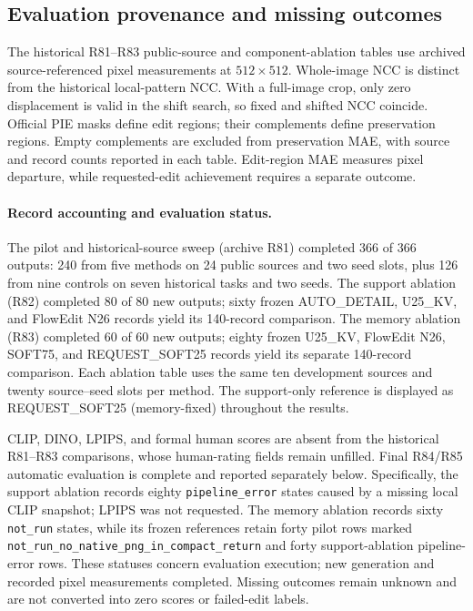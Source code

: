 \subsection{Evaluation provenance and missing outcomes}
\label{app:evaluation-provenance}
The historical R81--R83 public-source and component-ablation tables use archived source-referenced pixel measurements at $512\times512$. Whole-image NCC is distinct from the historical local-pattern NCC. With a full-image crop, only zero displacement is valid in the shift search, so fixed and shifted NCC coincide. Official PIE masks define edit regions; their complements define preservation regions. Empty complements are excluded from preservation MAE, with source and record counts reported in each table. Edit-region MAE measures pixel departure, while requested-edit achievement requires a separate outcome.

\paragraph{Record accounting and evaluation status.}
The pilot and historical-source sweep (archive R81) completed 366 of 366 outputs: 240 from five methods on 24 public sources and two seed slots, plus 126 from nine controls on seven historical tasks and two seeds. The support ablation (R82) completed 80 of 80 new outputs; sixty frozen AUTO\_DETAIL, U25\_KV, and FlowEdit N26 records yield its 140-record comparison. The memory ablation (R83) completed 60 of 60 new outputs; eighty frozen U25\_KV, FlowEdit N26, SOFT75, and REQUEST\_SOFT25 records yield its separate 140-record comparison. Each ablation table uses the same ten development sources and twenty source--seed slots per method. The support-only reference is displayed as REQUEST\_SOFT25 (memory-fixed) throughout the results.

CLIP, DINO, LPIPS, and formal human scores are absent from the historical R81--R83 comparisons, whose human-rating fields remain unfilled. Final R84/R85 automatic evaluation is complete and reported separately below. Specifically, the support ablation records eighty \texttt{pipeline\_error} states caused by a missing local CLIP snapshot; LPIPS was not requested. The memory ablation records sixty \texttt{not\_run} states, while its frozen references retain forty pilot rows marked \texttt{not\_run\_no\_native\_png\_in\_compact\_return} and forty support-ablation pipeline-error rows. These statuses concern evaluation execution; new generation and recorded pixel measurements completed. Missing outcomes remain unknown and are not converted into zero scores or failed-edit labels.

